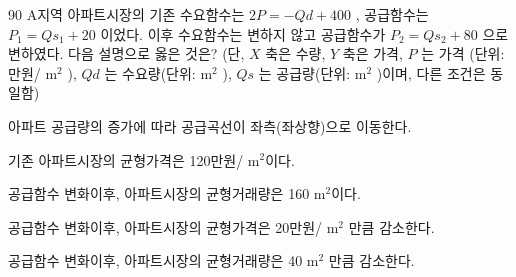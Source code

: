 \begin{question}{90}
A지역 아파트시장의 기존 수요함수는 $2P=-Qd+400$ , 공급함수는 $P_{1}=Qs_{1}+20$ 이었다. 이후 수요함수는 변하지 않고 공급함수가 $P_{2}=Qs_{2}+80$ 으로 변하였다. 다음 설명으로 옳은 것은? (단, $X$ 축은 수량, $Y$ 축은 가격, $P$ 는 가격 (단위: 만원/ $\mathrm{m}^{2}$ ), $Qd$ 는 수요량(단위: $\mathrm{m}^{2}$ ), $Qs$ 는 공급량(단위: $\mathrm{m}^{2}$ )이며, 다른 조건은 동일함)
\begin{choices}
  \item 아파트 공급량의 증가에 따라 공급곡선이 좌측(좌상향)으로 이동한다.
  \item 기존 아파트시장의 균형가격은 120만원/ $\mathrm{m}^{2}$이다.
  \item 공급함수 변화이후, 아파트시장의 균형거래량은 160 $\mathrm{m}^{2}$이다.
  \item 공급함수 변화이후, 아파트시장의 균형가격은 20만원/ $\mathrm{m}^{2}$ 만큼 감소한다.
  \item 공급함수 변화이후, 아파트시장의 균형거래량은 40 $\mathrm{m}^{2}$ 만큼 감소한다.
\end{choices}
\end{question}
